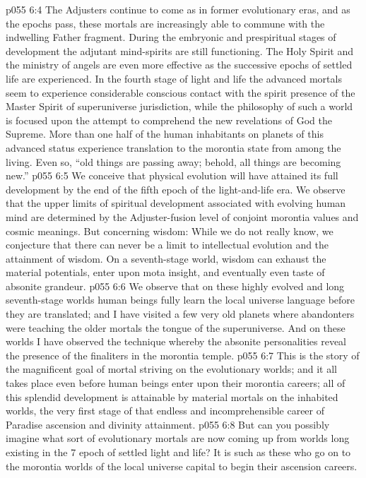 \vs p055 6:4 \pc The Adjusters continue to come as in former evolutionary eras, and as the epochs pass, these mortals are increasingly able to commune with the indwelling Father fragment. During the embryonic and prespiritual stages of development the adjutant mind\hyp{}spirits are still functioning. The Holy Spirit and the ministry of angels are even more effective as the successive epochs of settled life are experienced. In the fourth stage of light and life the advanced mortals seem to experience considerable conscious contact with the spirit presence of the Master Spirit of superuniverse jurisdiction, while the philosophy of such a world is focused upon the attempt to comprehend the new revelations of God the Supreme. More than one half of the human inhabitants on planets of this advanced status experience translation to the morontia state from among the living. Even so, “old things are passing away; behold, all things are becoming new.”
\vs p055 6:5 We conceive that physical evolution will have attained its full development by the end of the fifth epoch of the light\hyp{}and\hyp{}life era. We observe that the upper limits of spiritual development associated with evolving human mind are determined by the Adjuster\hyp{}fusion level of conjoint morontia values and cosmic meanings. But concerning wisdom: While we do not really know, we conjecture that there can never be a limit to intellectual evolution and the attainment of wisdom. On a seventh\hyp{}stage world, wisdom can exhaust the material potentials, enter upon mota insight, and eventually even taste of absonite grandeur.
\vs p055 6:6 We observe that on these highly evolved and long seventh\hyp{}stage worlds human beings fully learn the local universe language before they are translated; and I have visited a few very old planets where abandonters were teaching the older mortals the tongue of the superuniverse. And on these worlds I have observed the technique whereby the absonite personalities reveal the presence of the finaliters in the morontia temple.
\vs p055 6:7 \pc This is the story of the magnificent goal of mortal striving on the evolutionary worlds; and it all takes place even before human beings enter upon their morontia careers; all of this splendid development is attainable by material mortals on the inhabited worlds, the very first stage of that endless and incomprehensible career of Paradise ascension and divinity attainment.
\vs p055 6:8 But can you possibly imagine what sort of evolutionary mortals are now coming up from worlds long existing in the 7 epoch of settled light and life? It is such as these who go on to the morontia worlds of the local universe capital to begin their ascension careers.
